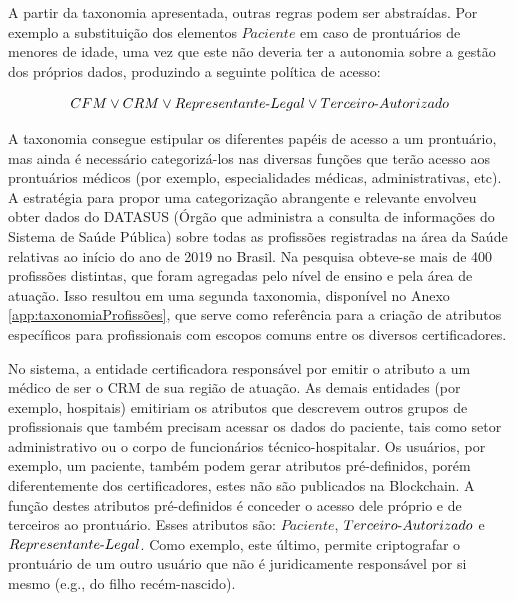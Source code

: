 \documentclass[a4paper,11pt]{article}
\begin{document}
A partir da taxonomia apresentada, outras regras podem ser abstraídas.
Por exemplo a substituição dos elementos $Paciente$ em caso de prontuários de menores de idade, uma vez que este não deveria ter a autonomia sobre a gestão dos próprios dados, produzindo a seguinte política de acesso:

\[ CFM \vee CRM \vee Representante\textnormal{-}Legal \vee Terceiro\textnormal{-}Autorizado \]

A taxonomia consegue estipular os diferentes papéis de acesso a um prontuário, mas ainda é necessário categorizá-los nas diversas funções que terão acesso aos prontuários médicos (por exemplo, especialidades médicas, administrativas, etc).
A estratégia para propor uma categorização abrangente e relevante envolveu obter dados do DATASUS (Órgão que administra a consulta de informações do Sistema de Saúde Pública) sobre todas as profissões registradas na área da Saúde relativas ao início do ano de 2019 no Brasil.
Na pesquisa obteve-se mais de 400 profissões distintas, que foram agregadas pelo nível de ensino e pela área de atuação.
Isso resultou em uma segunda taxonomia, disponível no Anexo \ref{app:taxonomiaProfissões}, que serve como referência para a criação de atributos específicos para profissionais com escopos comuns entre os diversos certificadores. %

No sistema, a entidade certificadora responsável por emitir o atributo a um médico de ser o CRM de sua região de atuação. As demais entidades (por exemplo, hospitais) emitiriam os atributos que descrevem outros grupos de profissionais que também precisam acessar os dados do paciente, tais como setor administrativo ou o corpo de funcionários técnico-hospitalar.
Os usuários, por exemplo, um paciente, também podem gerar atributos pré-definidos, porém diferentemente dos certificadores, estes não são publicados na Blockchain.
A função destes atributos pré-definidos é conceder o acesso dele próprio e de terceiros ao prontuário. %
Esses atributos são: $Paciente$, $Terceiro\textnormal{-}Autorizado$ e $Representante\textnormal{-}Legal$. %
Como exemplo, este último, permite criptografar o prontuário de um outro usuário que não é juridicamente responsável por si mesmo (e.g., do filho recém-nascido).

\end{document}
